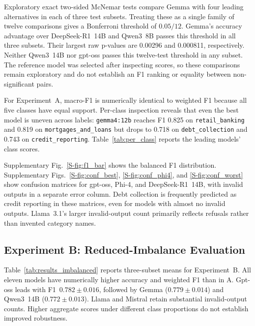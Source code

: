 \documentclass[pdflatex,sn-mathphys-num]{sn-jnl}
\begin{document}
Exploratory exact two-sided McNemar tests compare Gemma with four
leading alternatives in each of three test subsets. Treating these as a
single family of twelve comparisons gives a Bonferroni threshold of
$0.05/12$. Gemma's accuracy advantage over DeepSeek-R1~14B and Qwen3~8B
passes this threshold in all three subsets. Their largest raw p-values
are 0.00296 and 0.000811, respectively. Neither Qwen3~14B nor gpt-oss
passes this twelve-test threshold in any subset. The reference model
was selected after inspecting scores, so these comparisons remain
exploratory and do not establish an F1 ranking or equality between
non-significant pairs.

For Experiment~A, macro-F1 is numerically identical to weighted F1
because all five classes have equal support. Per-class inspection
reveals that even the best model is uneven across labels:
\texttt{gemma4:12b} reaches F1 0.825 on \texttt{retail\_banking} and
0.819 on \texttt{mortgages\_and\_loans} but drops to 0.718 on
\texttt{debt\_collection} and 0.743 on \texttt{credit\_reporting}.
Table~\ref{tab:per_class} reports the leading models' class scores.

Supplementary Fig.~\ref{S-fig:f1_bar} shows the balanced F1 distribution.
Supplementary Figs.~\ref{S-fig:conf_best}, \ref{S-fig:conf_phi4}, and
\ref{S-fig:conf_worst} show confusion matrices for gpt-oss, Phi-4,
and DeepSeek-R1~14B, with invalid outputs in a separate error column.
Debt collection is frequently predicted as credit reporting in these
matrices, even for models with almost no invalid outputs. Llama~3.1's larger invalid-output
count primarily reflects refusals rather than invented category names.

\subsection{Experiment B: Reduced-Imbalance Evaluation}

Table~\ref{tab:results_imbalanced} reports three-subset means for
Experiment~B. All eleven models have numerically higher accuracy and
weighted F1 than in A. Gpt-oss leads with F1~$0.782\pm0.016$,
followed by Gemma ($0.779\pm0.014$) and Qwen3~14B
($0.772\pm0.013$). Llama and Mistral retain substantial invalid-output
counts. Higher aggregate scores under different class proportions
do not establish improved robustness.
\end{document}

